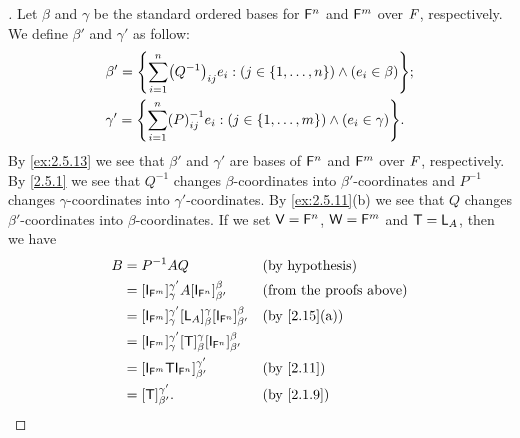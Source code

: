\begin{proof}[]
  Let \(\beta\) and \(\gamma\) be the standard ordered bases for \(\mathsf{F}^n\) and \(\mathsf{F}^m\) over \(\mathit{F}\), respectively.
  We define \(\beta'\) and \(\gamma'\) as follow:
  \begin{align*}
     & \beta' = \set{\sum_{i = 1}^n \pa{Q^{-1}}_{i j} e_i : (j \in \set{1, \dots, n}) \land (e_i \in \beta)};   \\
     & \gamma' = \set{\sum_{i = 1}^n \pa{P}^{-1}_{i j} e_i : (j \in \set{1, \dots, m}) \land (e_i \in \gamma)}.
  \end{align*}
  By \cref{ex:2.5.13} we see that \(\beta'\) and \(\gamma'\) are bases of \(\mathsf{F}^n\) and \(\mathsf{F}^m\) over \(\mathit{F}\), respectively.
  By \cref{2.5.1} we see that \(Q^{-1}\) changes \(\beta\)-coordinates into \(\beta'\)-coordinates and \(P^{-1}\) changes \(\gamma\)-coordinates into \(\gamma'\)-coordinates.
  By \cref{ex:2.5.11}(b) we see that \(Q\) changes \(\beta'\)-coordinates into \(\beta\)-coordinates.
  If we set \(\mathsf{V} = \mathsf{F}^n\), \(\mathsf{W} = \mathsf{F}^m\) and \(\mathsf{T} = \mathsf{L}_A\), then we have
  \begin{align*}
    B & = P^{-1} A Q                                                                                  &  & \text{(by hypothesis)}         \\
      & = [\IT[\vs{F}^m]]_{\gamma}^{\gamma'} A [\IT[\vs{F}^n]]_{\beta'}^{\beta}                       &  & \text{(from the proofs above)} \\
      & = [\IT[\vs{F}^m]]_{\gamma}^{\gamma'} [\L_A]_{\beta}^{\gamma} [\IT[\vs{F}^n]]_{\beta'}^{\beta} &  & \by{2.15}[a]                   \\
      & = [\IT[\vs{F}^m]]_{\gamma}^{\gamma'} [\T]_{\beta}^{\gamma} [\IT[\vs{F}^n]]_{\beta'}^{\beta}                                       \\
      & = [\IT[\vs{F}^m] \T \IT[\vs{F}^n]]_{\beta'}^{\gamma'}                                         &  & \by{2.11}                      \\
      & = [\T]_{\beta'}^{\gamma'}.                                                                    &  & \by{2.1.9}
  \end{align*}
\end{proof}
